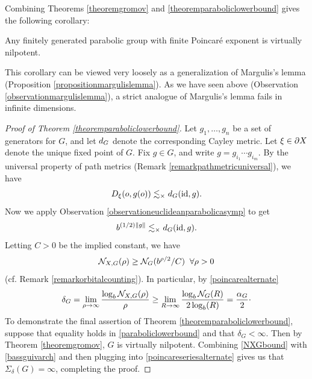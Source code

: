Combining Theorems \ref{theoremgromov} and \ref{theoremparaboliclowerbound} gives the following corollary:

\begin{corollary}
\label{corollaryfiniteimpliesnilpotent}
Any finitely generated parabolic group with finite Poincar\'e exponent is virtually nilpotent.
\end{corollary}
\noindent This corollary can be viewed very loosely as a generalization of Margulis's lemma (Proposition \ref{propositionmargulislemma}). As we have seen above (Observation \ref{observationmargulislemma}), a strict analogue of Margulis's lemma fails in infinite dimensions.
\begin{proof}[Proof of Theorem \ref{theoremparaboliclowerbound}]
Let $g_1,\ldots,g_n$ be a set of generators for $G$, and let $d_G$ denote the corresponding Cayley metric. Let $\xi\in\partial X$ denote the unique fixed point of $G$. Fix $g\in G$, and write $g = g_{i_1}\cdots g_{i_m}$. By the universal property of path metrics (Remark \ref{remarkpathmetricuniversal}), we have
\[
D_\xi(o,g(o)) \lesssim_\times d_G(\mathrm{id},g).
\]
Now we apply Observation \ref{observationeuclideanparabolicasymp} to get
\[
b^{(1/2)\|g\|} \lesssim_\times d_G(\mathrm{id},g).
\]
Letting $C > 0$ be the implied constant, we have
\begin{equation}
\label{NXGbound}
\mathcal N_{X,G}(\rho) \geq \mathcal N_G(b^{\rho/2}/C) \;\;\forall \rho > 0
\end{equation}
(cf. Remark \ref{remarkorbitalcounting}). In particular, by \eqref{poincarealternate}
\[
\delta_G = \lim_{\rho\to\infty}\frac{\log_b\mathcal N_{X,G}(\rho)}{\rho} \geq \lim_{R\to\infty}\frac{\log_b\mathcal N_G(R)}{2\log_b(R)} = \frac{\alpha_G}{2}\cdot
\]
To demonstrate the final assertion of Theorem \ref{theoremparaboliclowerbound}, suppose that equality holds in \eqref{paraboliclowerbound} and that $\delta_G < \infty$. Then by Theorem \ref{theoremgromov}, $G$ is virtually nilpotent. Combining \eqref{NXGbound} with \eqref{bassguivarch} and then plugging into \eqref{poincareseriesalternate} gives us that $\Sigma_\delta(G) = \infty$, completing the proof.

\end{proof}
